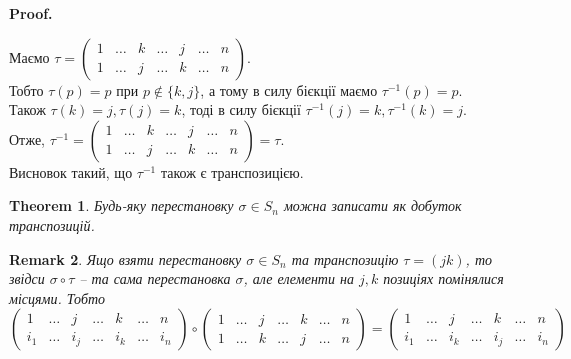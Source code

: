 \documentclass[a4paper, 10pt]{article}
\makeatletter
\theoremstyle{theoremdd}
\newtheorem{theorem}{Theorem}[subsection]
\theoremstyle{theoremdd}
\theoremstyle{theoremdd}
\theoremstyle{theoremdd}
\theoremstyle{theoremdd}
\theoremstyle{theoremdd}
\theoremstyle{theoremdd}
\theoremstyle{theoremdd}
\theoremstyle{theoremdd}
\theoremstyle{theoremdd}
\theoremstyle{theoremdd}
\newtheorem{remark}[theorem]{Remark}
\theoremstyle{theoremdd}
\theoremstyle{theoremdd}
\theoremstyle{theoremdd}
\theoremstyle{theoremdd}
\renewenvironment{proof}[1][Proof.\\]{\par
\pushQED{\hfill \qed}%
\normalfont \topsep6\p@\@plus6\p@\relax
\trivlist
\item\relax
{\bfseries
#1\@addpunct{.}}\hspace\labelsep\ignorespaces
}{%
\popQED\endtrivlist\@endpefalse
}
\makeatother
\begin{document}
\begin{proof}
Маємо $\tau = \begin{pmatrix}
1 & \dots & k & \dots & j & \dots & n \\
1 & \dots & j & \dots & k & \dots & n
\end{pmatrix}$.\\
Тобто $\tau(p) = p$ при $p \not\in \{k,j\}$, а тому в силу бієкції маємо $\tau^{-1}(p) = p$.\\
Також $\tau(k) = j, \tau(j) = k$, тоді в силу бієкції $\tau^{-1}(j) = k, \tau^{-1}(k) = j$.\\
Отже, $\tau^{-1} = \begin{pmatrix}
1 & \dots & k & \dots & j & \dots & n \\
1 & \dots & j & \dots & k & \dots & n
\end{pmatrix} = \tau$. \\
Висновок такий, що $\tau^{-1}$ також є транспозицією.
\end{proof}

\begin{theorem}
Будь-яку перестановку $\sigma \in S_n$ можна записати як добуток транспозицій.
\end{theorem}

\begin{remark}
Ящо взяти перестановку $\sigma \in S_n$ та транспозицію $\tau = (jk)$, то звідси $\sigma \circ \tau$ -- та сама перестановка $\sigma$, але елементи на $j,k$ позиціях помінялися місцями. Тобто\\
$\begin{pmatrix}
1 & \dots & j & \dots & k & \dots & n \\
i_1 & \dots & i_j & \dots & i_k & \dots & i_n
\end{pmatrix} \circ \begin{pmatrix}
1 & \dots & j & \dots & k & \dots & n \\
1 & \dots & k & \dots & j & \dots & n
\end{pmatrix} = \begin{pmatrix}
1 & \dots & j & \dots & k & \dots & n \\
i_1 & \dots & i_k & \dots & i_j & \dots & i_n
\end{pmatrix}$
\end{remark}
\end{document}
